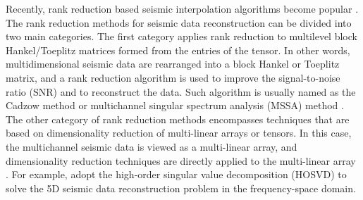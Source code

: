 Recently, rank reduction based seismic interpolation algorithms become popular \cite[]{trickett2009,oropezamssa}.  The rank reduction methods for seismic data reconstruction can be divided into two main categories. The first category applies rank reduction to multilevel block Hankel/Toeplitz matrices formed from the entries of the tensor. In other words, multidimensional seismic data are rearranged into a block Hankel or Toeplitz matrix, and a rank reduction algorithm is used to improve the signal-to-noise ratio (SNR) and to reconstruct the data. Such algorithm is usually named as the Cadzow method \cite[]{trickett2009} or multichannel singular spectrum analysis (MSSA) method \cite[]{oropezamssa}.
The other category of rank reduction methods encompasses techniques that are based on dimensionality reduction of multi-linear arrays or tensors. In this case, the multichannel seismic data is viewed as a multi-linear array, and dimensionality reduction techniques are directly applied to the multi-linear array \cite[]{jianjun2015}. For example, \cite{kreimer2012} adopt the high-order singular value decomposition (HOSVD) to solve the 5D seismic data reconstruction problem in the frequency-space domain.  

